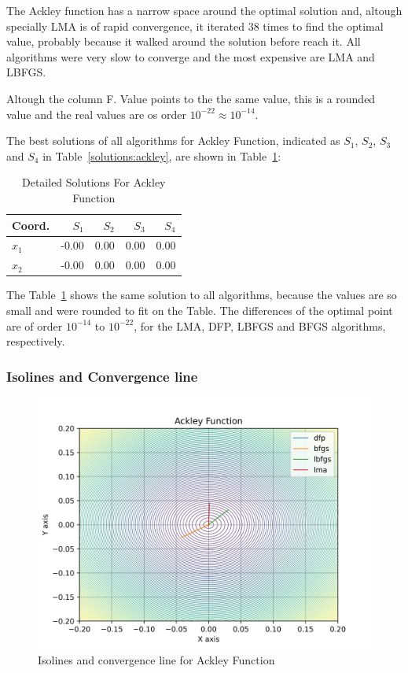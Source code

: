 \documentclass[conference]{IEEEtran}
\begin{document}
The Ackley function has a narrow space around the optimal solution and,
altough specially LMA is of rapid convergence, it iterated 38 times to find
the optimal value, probably because it walked around the solution
before reach it. All algorithms were very slow to converge and the most expensive
are LMA and LBFGS.

Altough the column F. Value points to the the same value, this is a rounded value
and the real values are os order $10^{-22} \approx 10^{-14}$.


The best solutions of all algorithms for Ackley Function, indicated as
$S_{1}$, $S_{2}$, $S_{3}$ and $S_{4}$ in Table~\ref{solutions:ackley}, are shown
in Table~\ref{detailedsolutions:ackley}:

\begin{table}[H]
\centering
\caption{Detailed Solutions For Ackley Function}
\label{detailedsolutions:ackley}
\begin{tabular}{lrrrr}
\toprule
 Coord. &  $S_{1}$ &  $S_{2}$ &  $S_{3}$ &  $S_{4}$ \\
\midrule
$x_{1}$ &    -0.00 &     0.00 &     0.00 &     0.00 \\
$x_{2}$ &    -0.00 &     0.00 &     0.00 &     0.00 \\
\bottomrule
\end{tabular}
\end{table}

The Table~\ref{detailedsolutions:ackley} shows the same solution to all algorithms, because the values are so small
and were rounded to fit on the Table. The differences of the optimal point are of order $10^{-14}$ to $10^{-22}$,
for the LMA, DFP, LBFGS and BFGS algorithms, respectively.


\subsubsection{Isolines and Convergence line}
\label{isolinesackley2D}

\begin{figure}[H]
\centering
\caption{Isolines and convergence line for Ackley Function}
\label{fig:ackley}
\includegraphics[scale=0.5]{images/ackley.jpg}
\end{figure}
\end{document}
